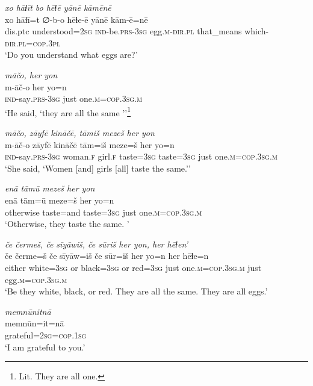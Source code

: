 \ea \label{ŽH.82}
\textit{xo hāɫīt bo hēɫē yānē kāmēnē} \\ 
\gll xo hāɫī=t ∅-b-o hēɫe-ē yānē kām-ē=nē \\ 
 dis.ptc understood\textsc{=\textsc{2sg}} \textsc{ind-}be\textsc{.prs}\textsc{-3sg} egg\textsc{.m}\textsc{-dir}\textsc{.pl} that\_means which\textsc{-dir}\textsc{.pl}\textsc{=cop}\textsc{.3pl} \\ 
\glt `Do you understand what eggs are?'
\z 
 
\ea \label{ŽH.98}
\textit{māčo, her yon} \\ 
\gll m-āč-o her yo=n \\ 
 \textsc{ind-}say\textsc{.prs}\textsc{-3sg} just one\textsc{.m}\textsc{=cop}\textsc{.3sg}\textsc{.m} \\ 
\glt `He said, ‘they are all the same ’'\footnote{Lit. They are all one.}
\z 
 
\ea \label{ŽH.99}
\textit{māčo, zāyfē kināčē, tāmiš mezeš her yon} \\ 
\gll m-āč-o zāyfē kināčē tām=iš meze=š her yo=n \\ 
 \textsc{ind-}say\textsc{.prs}\textsc{-3sg} woman\textsc{\textsc{.f}} girl\textsc{\textsc{.f}} taste\textsc{=3sg} taste\textsc{=3sg} just one\textsc{.m}\textsc{=cop}\textsc{.3sg}\textsc{.m} \\ 
\glt `She said,  ‘Women [and] girls [all] taste the same.’'
\z 
 
\ea \label{ŽH.101}
\textit{enā tāmū mezeš her yon} \\ 
\gll enā tām=ū meze=š her yo=n \\ 
 otherwise taste=and taste\textsc{=3sg} just one\textsc{.m}\textsc{=cop}\textsc{.3sg}\textsc{.m} \\ 
\glt `Otherwise, they taste the same. '
\z 
 
\ea \label{ŽH.102}
\textit{če čermeš, če sīyāwiš, če sūriš her yon, her hēɫen’} \\ 
\gll če čerme=š če sīyāw=iš če sūr=iš her yo=n her hēɫe=n \\ 
 either white\textsc{=3sg} or black\textsc{=3sg} or red\textsc{=3sg} just one\textsc{.m}\textsc{=cop}\textsc{.3sg}\textsc{.m} just egg\textsc{.m}\textsc{=cop}\textsc{.3sg}\textsc{.m} \\ 
\glt `Be they white, black, or red. They are all the same. They are all eggs.'
\z 
 
\ea \label{ŽH.105}
\textit{memnūnitnā} \\ 
\gll memnūn=it=nā \\ 
 grateful\textsc{=\textsc{2sg}}\textsc{=cop}\textsc{.1sg} \\ 
\glt `I am grateful to you.'
\z 
 
